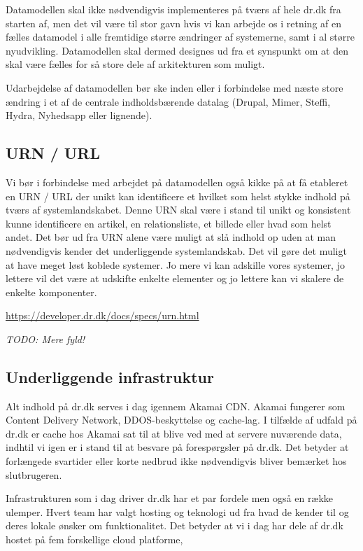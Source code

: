 \documentclass{article}
\begin{document}
Datamodellen skal ikke nødvendigvis implementeres på tværs af hele dr.dk fra starten af, men det vil være til stor gavn hvis vi kan arbejde os i retning af en fælles datamodel i alle fremtidige større ændringer af systemerne, samt i al større nyudvikling. Datamodellen skal dermed designes ud fra et synspunkt om at den skal være fælles for så store dele af arkitekturen som muligt.

Udarbejdelse af datamodellen bør ske inden eller i forbindelse med næste store ændring i et af de centrale indholdsbærende datalag (Drupal, Mimer, Steffi, Hydra, Nyhedsapp eller lignende).


\subsection{URN / URL}
Vi bør i forbindelse med arbejdet på datamodellen også kikke på at få etableret en URN / URL der unikt kan identificere et hvilket som helst stykke indhold på tværs af systemlandskabet. Denne URN skal være i stand til unikt og konsistent kunne identificere en artikel, en relationsliste, et billede eller hvad som helst andet. Det bør ud fra URN alene være muligt at slå indhold op uden at man nødvendigvis kender det underliggende systemlandskab. Det vil gøre det muligt at have meget løst koblede systemer.
Jo mere vi kan adskille vores systemer, jo lettere vil det være at udskifte enkelte elementer og jo lettere kan vi skalere de enkelte komponenter. 

\url{https://developer.dr.dk/docs/specs/urn.html}


    \textit{TODO: Mere fyld!}


\subsection{Underliggende infrastruktur}
Alt indhold på dr.dk serves i dag igennem Akamai CDN. Akamai fungerer som Content Delivery Network, DDOS-beskyttelse og cache-lag. I tilfælde af udfald på dr.dk er cache hos Akamai sat
til at blive ved med at servere nuværende data, indhtil vi igen er i stand til at besvare på forespørgsler på dr.dk. Det betyder at forlængede svartider eller korte nedbrud ikke nødvendigvis bliver bemærket hos slutbrugeren.

Infrastrukturen som i dag driver dr.dk har et par fordele men også en række ulemper. Hvert team har valgt hosting og teknologi ud fra hvad de kender til og deres lokale ønsker om funktionalitet. Det betyder at vi i dag har dele af dr.dk hostet på fem forskellige cloud platforme,
\end{document}
